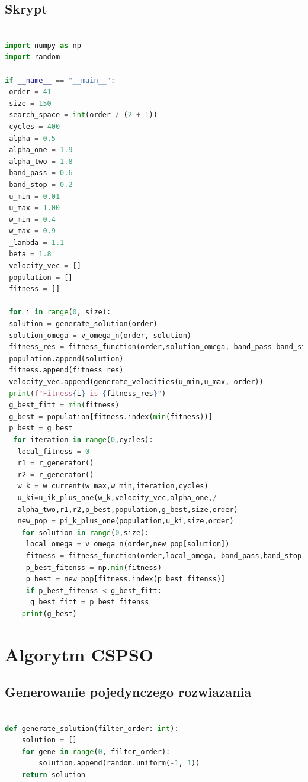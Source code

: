 \documentclass[eng, pl, oneside, openright, final, openbib]{mgr}\DeclareUnicodeCharacter{0301}{\'{e}}
\begin{document}
\subsection{Skrypt}

\begin{small}
\begin{lstlisting}[language=Python, caption=Implementacja skryptu z algorytmem PSO]

import numpy as np
import random

if __name__ == "__main__":
 order = 41
 size = 150
 search_space = int(order / (2 + 1))
 cycles = 400
 alpha = 0.5
 alpha_one = 1.9
 alpha_two = 1.8
 band_pass = 0.6
 band_stop = 0.2
 u_min = 0.01
 u_max = 1.00
 w_min = 0.4
 w_max = 0.9
 _lambda = 1.1
 beta = 1.8
 velocity_vec = []
 population = []
 fitness = []

 for i in range(0, size):
 solution = generate_solution(order)
 solution_omega = v_omega_n(order, solution)
 fitness_res = fitness_function(order,solution_omega, band_pass band_stop)
 population.append(solution)
 fitness.append(fitness_res)
 velocity_vec.append(generate_velocities(u_min,u_max, order))
 print(f"Fitness{i} is {fitness_res}")
 g_best_fitt = min(fitness)
 g_best = population[fitness.index(min(fitness))]
 p_best = g_best
  for iteration in range(0,cycles):
   local_fitness = 0
   r1 = r_generator()
   r2 = r_generator()
   w_k = w_current(w_max,w_min,iteration,cycles)
   u_ki=u_ik_plus_one(w_k,velocity_vec,alpha_one,/
   alpha_two,r1,r2,p_best,population,g_best,size,order)
   new_pop = pi_k_plus_one(population,u_ki,size,order)
    for solution in range(0,size):
     local_omega = v_omega_n(order,new_pop[solution])
     fitness = fitness_function(order,local_omega, band_pass,band_stop)
     p_best_fitenss = np.min(fitness)
     p_best = new_pop[fitness.index(p_best_fitenss)]
     if p_best_fitenss < g_best_fitt:
      g_best_fitt = p_best_fitenss
    print(g_best) 
\end{lstlisting}
\end{small}
\newpage
\section{Algorytm CSPSO}

\subsection{Generowanie pojedynczego rozwiazania}
\begin{lstlisting}[language=Python, caption=Implementacja stworzenia pojedynczego rozwiązania]

def generate_solution(filter_order: int):
    solution = []
    for gene in range(0, filter_order):
        solution.append(random.uniform(-1, 1))
    return solution
\end{lstlisting}
\end{document}
